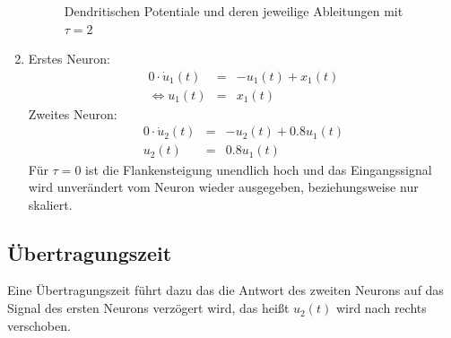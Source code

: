 \documentclass[DIN, pagenumber=false, fontsize=11pt, parskip=half]{scrartcl}
\begin{document}
\begin{enumerate}[label=(\alph*)]
\begin{figure}[H]
                \caption{Dendritischen Potentiale und deren jeweilige Ableitungen mit $\tau=2$}
            \end{figure} 
        \item           
            Erstes Neuron:
            \begin{eqnarray*}
                0 \cdot \dot{u}_1(t) &=& -u_1(t) + x_1(t) \\
                \Leftrightarrow u_1(t) &=& x_1(t) 
            \end{eqnarray*}
            Zweites Neuron:
            \begin{eqnarray*}
                0 \cdot \dot{u}_2(t) &=& -u_2(t) + 0.8 u_1(t) \\
                u_2(t) &=& 0.8 u_1(t) 
            \end{eqnarray*}
            Für $\tau = 0$ ist die Flankensteigung unendlich hoch und das Eingangssignal wird unverändert vom
            Neuron wieder ausgegeben, beziehungsweise nur skaliert.
    \end{enumerate}

    \subsection{Übertragungszeit}
    Eine Übertragungszeit führt dazu das die Antwort des zweiten Neurons auf das Signal des ersten Neurons verzögert
    wird, das heißt $u_2(t)$ wird nach rechts verschoben.
\end{document}
